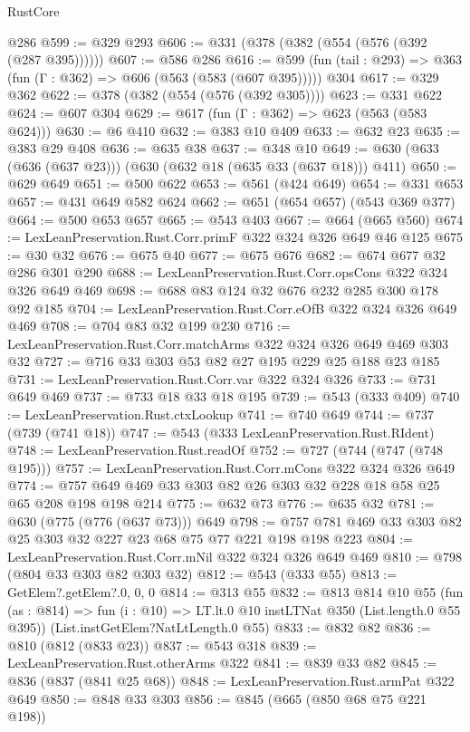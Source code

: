 \begin{lexlean}{RustCore}
\begin{coremodule}
    @286
@599 := @329 @293
@606 := @331 (@378 (@382 (@554 (@576 (@392 (@287 @395))))))
@607 := @586 @286
@616 := @599 (fun (tail : @293) => @363 (fun (Γ : @362) => @606 (@563 (@583 (@607 @395))))) @304
@617 := @329 @362
@622 := @378 (@382 (@554 (@576 (@392 @305))))
@623 := @331 @622
@624 := @607 @304
@629 := @617 (fun (Γ : @362) => @623 (@563 (@583 @624)))
@630 := @6 @410
@632 := @383 @10 @409
@633 := @632 @23
@635 := @383 @29 @408
@636 := @635 @38
@637 := @348 @10
@649 := @630 (@633 (@636 (@637 @23))) (@630 (@632 @18 (@635 @33 (@637 @18))) @411)
@650 := @629 @649
@651 := @500 @622
@653 := @561 (@424 @649)
@654 := @331 @653
@657 := @431 @649 @582 @624
@662 := @651 (@654 @657) (@543 @369 @377)
@664 := @500 @653 @657
@665 := @543 @403
@667 := @664 (@665 @560)
@674 := LexLeanPreservation.Rust.Corr.primF @322 @324 @326 @649 @46 @125
@675 := @30 @32
@676 := @675 @40
@677 := @675 @676
@682 := @674 @677 @32 @286 @301 @290
@688 := LexLeanPreservation.Rust.Corr.opsCons @322 @324 @326 @649 @469
@698 := @688 @83 @124 @32 @676 @232 @285 @300 @178 @92 @185
@704 := LexLeanPreservation.Rust.Corr.eOfB @322 @324 @326 @649 @469
@708 := @704 @83 @32 @199 @230
@716 := LexLeanPreservation.Rust.Corr.matchArms @322 @324 @326 @649 @469 @303 @32
@727 := @716 @33 @303 @53 @82 @27 @195 @229 @25 @188 @23 @185
@731 := LexLeanPreservation.Rust.Corr.var @322 @324 @326
@733 := @731 @649 @469
@737 := @733 @18 @33 @18 @195
@739 := @543 (@333 @409)
@740 := LexLeanPreservation.Rust.ctxLookup
@741 := @740 @649
@744 := @737 (@739 (@741 @18))
@747 := @543 (@333 LexLeanPreservation.Rust.RIdent)
@748 := LexLeanPreservation.Rust.readOf
@752 := @727 (@744 (@747 (@748 @195)))
@757 := LexLeanPreservation.Rust.Corr.mCons @322 @324 @326 @649
@774 := @757 @649 @469 @33 @303 @82 @26 @303 @32 @228 @18 @58 @25 @65 @208 @198 @198 @214
@775 := @632 @73
@776 := @635 @32
@781 := @630 (@775 (@776 (@637 @73))) @649
@798 := @757 @781 @469 @33 @303 @82 @25 @303 @32 @227 @23 @68 @75 @77 @221 @198 @198 @223
@804 := LexLeanPreservation.Rust.Corr.mNil @322 @324 @326 @649 @469
@810 := @798 (@804 @33 @303 @82 @303 @32)
@812 := @543 (@333 @55)
@813 := GetElem?.getElem?.{0, 0, 0}
@814 := @313 @55
@832 := @813
    @814
    @10
    @55
    (fun (as : @814) => fun (i : @10) => LT.lt.{0} @10 instLTNat @350 (List.length.{0} @55 @395))
    (List.instGetElem?NatLtLength.{0} @55)
@833 := @832 @82
@836 := @810 (@812 (@833 @23))
@837 := @543 @318
@839 := LexLeanPreservation.Rust.otherArms @322
@841 := @839 @33 @82
@845 := @836 (@837 (@841 @25 @68))
@848 := LexLeanPreservation.Rust.armPat @322 @649
@850 := @848 @33 @303
@856 := @845 (@665 (@850 @68 @75 @221 @198))

\end{coremodule}
\end{lexlean}
